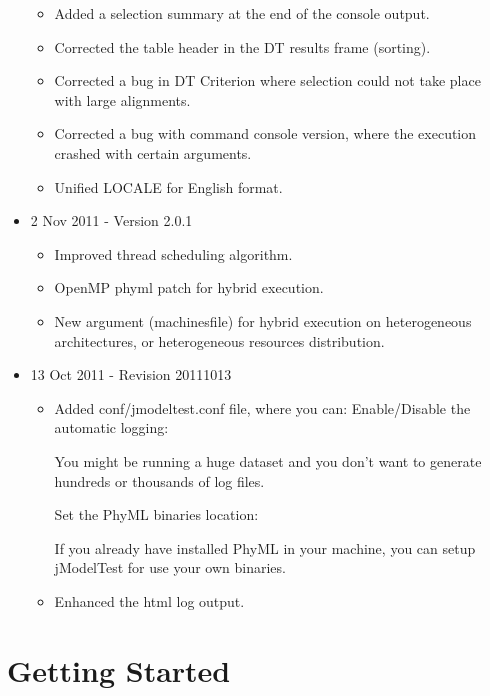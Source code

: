 \documentclass[11pt,twoside,a4paper]{article}
\begin{document}
\begin{itemize}
	\begin{itemize}
		\item Added a selection summary at the end of the console output.
		\item Corrected the table header in the DT results frame (sorting).
		\item Corrected a bug in DT Criterion where selection could not take place with large alignments.
		\item Corrected a bug with command console version, where the execution crashed with certain arguments.
		\item Unified LOCALE for English format. 
	\end{itemize}

	\item 2 Nov 2011 - Version 2.0.1

	\begin{itemize}
		\item Improved thread scheduling algorithm.
		\item OpenMP phyml patch for hybrid execution.
		\item New argument (machinesfile) for hybrid execution on heterogeneous architectures, or heterogeneous resources distribution. 
	\end{itemize}

	\item 13 Oct 2011 - Revision 20111013

	\begin{itemize}
		\item Added conf/jmodeltest.conf file, where you can:
			Enable/Disable the automatic logging:

			    You might be running a huge dataset and you don't want to generate hundreds or thousands of log files. 

			Set the PhyML binaries location:

			    If you already have installed PhyML in your machine, you can setup jModelTest for use your own binaries. 

		\item Enhanced the html log output. 
	\end{itemize}

\end{itemize}


\section{Getting Started}
\end{document}
